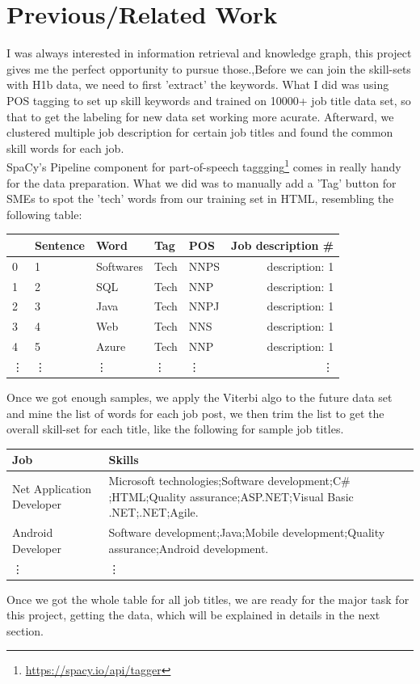 \section{Previous/Related Work}
I was always interested in  information retrieval  and knowledge graph, this project gives me the perfect opportunity to pursue those.,Before we can join the skill-sets with H1b data, we need to first 'extract' the keywords.  What I did was using POS tagging to set up skill keywords and trained on 10000+  job title data set, so that to get the labeling for new data set working more acurate. Afterward, we clustered multiple job description for certain job titles and found the common  skill words for each job. \\ 
SpaCy's Pipeline component for part-of-speech taggging\footnote{\url {https://spacy.io/api/tagger}} comes in  really handy for the  data preparation. What we did was to manually add a 'Tag' button for SMEs to spot the 'tech' words from our training set in HTML, resembling the following table:
{
	\begin{center}
		\begin{tabular}{| l | l | l | l | l | r| } 
			\hline
			&	Sentence	&	Word	&	Tag	 & POS &	Job description \# \\ \hline
			0	&	1	&	Softwares		&Tech	& NNPS	&description: 1 \\ \hline
			1	&	2	&	SQL	&	Tech	& NNP &	description: 1 \\ \hline
			2	&	3	&	Java	&	Tech & NNPJ	&	description: 1	\\ \hline
			3		&4		&Web	&	Tech	& NNS&	description: 1\\ \hline
			4	&	5	&	Azure		&Tech	& NNP	&description: 1\\ \hline
			\vdots	&		\vdots	&		\vdots		&	\vdots	&	\vdots	&	\vdots\\ \hline
		\end{tabular}
\end{center}}
Once we got enough samples, we apply the Viterbi algo to the future data set and mine the list of words for each job post, we then trim the list to get the overall skill-set for each title, like the following for sample job titles.  

\begin{center}
	\begin{tabular}{ | p{2.5cm} |p{4.5cm} |}
		\hline
		Job & Skills \\ \hline
		Net Application Developer& Microsoft technologies;Software development;C$\#$;HTML;Quality assurance;ASP.NET;Visual Basic .NET;.NET;Agile.\\\hline
		Android Developer	& Software development;Java;Mobile development;Quality assurance;Android development.\\\hline
		\vdots	&	\vdots\\ \hline
	\end{tabular}
\end{center}
Once we got the whole table for all job titles, we are ready for the major task for this project, getting the data, which will be explained in details in the next section.
